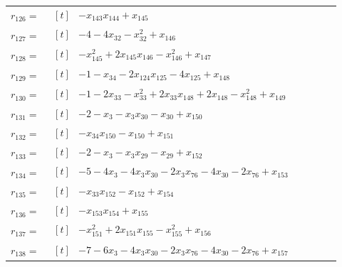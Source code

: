 \begin{longtable}{@{}r p{0.92\linewidth}@{}}
$r_{126}=$ & $\begin{aligned}[t]&-x_{143}x_{144}+x_{145}\end{aligned}$ \\[2pt]
$r_{127}=$ & $\begin{aligned}[t]&-4-4x_{32}-x_{32}^{2}+x_{146}\end{aligned}$ \\[2pt]
$r_{128}=$ & $\begin{aligned}[t]&-x_{145}^{2}+2x_{145}x_{146}-x_{146}^{2}+x_{147}\end{aligned}$ \\[2pt]
$r_{129}=$ & $\begin{aligned}[t]&-1-x_{34}-2x_{124}x_{125}-4x_{125}+x_{148}\end{aligned}$ \\[2pt]
$r_{130}=$ & $\begin{aligned}[t]&-1-2x_{33}-x_{33}^{2}+2x_{33}x_{148}+2x_{148}-x_{148}^{2}+x_{149}\end{aligned}$ \\[2pt]
$r_{131}=$ & $\begin{aligned}[t]&-2-x_{3}-x_{3}x_{30}-x_{30}+x_{150}\end{aligned}$ \\[2pt]
$r_{132}=$ & $\begin{aligned}[t]&-x_{34}x_{150}-x_{150}+x_{151}\end{aligned}$ \\[2pt]
$r_{133}=$ & $\begin{aligned}[t]&-2-x_{3}-x_{3}x_{29}-x_{29}+x_{152}\end{aligned}$ \\[2pt]
$r_{134}=$ & $\begin{aligned}[t]&-5-4x_{3}-4x_{3}x_{30}-2x_{3}x_{76}-4x_{30}-2x_{76}+x_{153}\end{aligned}$ \\[2pt]
$r_{135}=$ & $\begin{aligned}[t]&-x_{33}x_{152}-x_{152}+x_{154}\end{aligned}$ \\[2pt]
$r_{136}=$ & $\begin{aligned}[t]&-x_{153}x_{154}+x_{155}\end{aligned}$ \\[2pt]
$r_{137}=$ & $\begin{aligned}[t]&-x_{151}^{2}+2x_{151}x_{155}-x_{155}^{2}+x_{156}\end{aligned}$ \\[2pt]
$r_{138}=$ & $\begin{aligned}[t]&-7-6x_{3}-4x_{3}x_{30}-2x_{3}x_{76}-4x_{30}-2x_{76}+x_{157}\end{aligned}$ \\[2pt]

\end{longtable}
